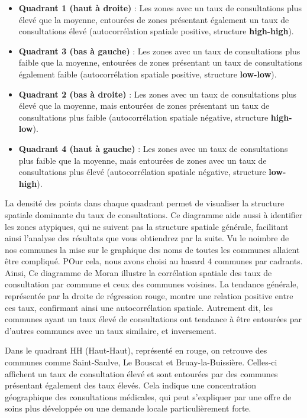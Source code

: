 \documentclass[
]{article}
\providecommand{\tightlist}{%
  \setlength{\itemsep}{0pt}\setlength{\parskip}{0pt}}
\begin{document}
\begin{itemize}
\tightlist
\item
  \textbf{Quadrant 1 (haut à droite)} : Les zones avec un taux de
  consultations plus élevé que la moyenne, entourées de zones présentant
  également un taux de consultations élevé (autocorrélation spatiale
  positive, structure \textbf{high-high}).
\item
  \textbf{Quadrant 3 (bas à gauche)} : Les zones avec un taux de
  consultations plus faible que la moyenne, entourées de zones
  présentant un taux de consultations également faible (autocorrélation
  spatiale positive, structure \textbf{low-low}).
\item
  \textbf{Quadrant 2 (bas à droite)} : Les zones avec un taux de
  consultations plus élevé que la moyenne, mais entourées de zones
  présentant un taux de consultations plus faible (autocorrélation
  spatiale négative, structure \textbf{high-low}).
\item
  \textbf{Quadrant 4 (haut à gauche)} : Les zones avec un taux de
  consultations plus faible que la moyenne, mais entourées de zones avec
  un taux de consultations plus élevé (autocorrélation spatiale
  négative, structure \textbf{low-high}).
\end{itemize}

La densité des points dans chaque quadrant permet de visualiser la
structure spatiale dominante du taux de consultations. Ce diagramme aide
aussi à identifier les zones atypiques, qui ne suivent pas la structure
spatiale générale, facilitant ainsi l'analyse des résultats que vous
obtiendrez par la suite. Vu le noimbre de nos communes la mise sur le
graphique des noms de toutes les communes allaient être compliqué. POur
cela, nous avons choisi au hasard 4 communes par cadrants. Ainsi, Ce
diagramme de Moran illustre la corrélation spatiale des taux de
consultation par commune et ceux des communes voisines. La tendance
générale, représentée par la droite de régression rouge, montre une
relation positive entre ces taux, confirmant ainsi une autocorrélation
spatiale. Autrement dit, les communes ayant un taux élevé de
consultations ont tendance à être entourées par d'autres communes avec
un taux similaire, et inversement.

Dans le quadrant HH (Haut-Haut), représenté en rouge, on retrouve des
communes comme Saint-Saulve, Le Bouscat et Bruay-la-Buissière. Celles-ci
affichent un taux de consultation élevé et sont entourées par des
communes présentant également des taux élevés. Cela indique une
concentration géographique des consultations médicales, qui peut
s'expliquer par une offre de soins plus développée ou une demande locale
particulièrement forte.
\end{document}
